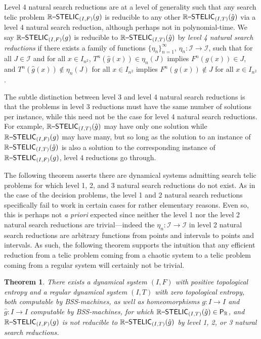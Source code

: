 \documentclass{amsart}
\theoremstyle{theorem}
\newtheorem{theorem}{Theorem}[section]
\theoremstyle{remark}
\newcommand{\RR}{\mathbb{R}}
\newcommand{\ccP}{\textsf{\upshape P}}
\newcommand{\ccRSTELIC}{\mathbb{R}\textsf{\upshape --STELIC}}
\newcommand{\cI}{\mathcal{I}}
\begin{document}
Level 4 natural search reductions are at a level of generality such that any search telic problem $\ccRSTELIC_{(I, F)}(g)$ is reducible to any other $\ccRSTELIC_{(I, T)}(\hat{g})$ via a level 4 natural search reduction, although perhaps not in polynomial-time. We say $\ccRSTELIC_{(I, F)}(g)$ is reducible to $\ccRSTELIC_{(I, T)}(\hat{g})$ by \emph{level 4 natural search reductions} if there exists a family of functions $\{\eta_n\}_{n=1}^\infty$, $\eta_n:\cI\rightarrow \cI$, such that for all $J \in \cI$ and for all $x \in I_{n^2}$, $T^n(\hat{g}(x)) \in \eta_n(J)$ implies $F^n(g(x)) \in J$, and $T^n(\hat{g}(x)) \not\in \eta_n(J)$ for all $x \in I_{n^2}$ implies $F^n(g(x)) \not\in J$ for all $x \in I_{n^2}$.

The subtle distinction between level 3 and level 4 natural search reductions is that the problems in level 3 reductions must have the same number of solutions per instance, while this need not be the case for level 4 natural search reductions. For example, $\ccRSTELIC_{(I, T)}(\hat{g})$ may have only one solution while $\ccRSTELIC_{(I, F)}(g)$ may have many, but so long as the solution to an instance of $\ccRSTELIC_{(I, T)}(\hat{g})$ is also a solution to the corresponding instance of $\ccRSTELIC_{(I, F)}(g)$, level 4 reductions go through.

The following theorem asserts there are dynamical systems admitting search telic problems for which level 1, 2, and 3 natural search reductions do not exist. As in the case of the decision problems, the level 1 and 2 natural search reductions specifically fail to work in certain cases for rather elementary reasons. Even so, this is perhaps not \emph{a priori} expected since neither the level 1 nor the level 2 natural search reductions are trivial---indeed the $\eta_n:\cI\rightarrow \cI$ in level 2 natural search reductions are arbitrary functions from points and intervals to points and intervals. As such, the following theorem supports the intuition that any efficient reduction from a telic problem coming from a chaotic system to a telic problem coming from a regular system will certainly not be trivial.

\begin{theorem}\label{thmNoNaturalSearch}
There exists a dynamical system $(I, F)$ with positive topological entropy and a regular dynamical system $(I, T)$ with zero topological entropy, both computable by BSS-machines, as well as homeomorphisms $g:I\rightarrow I$ and $\hat{g}:I\rightarrow I$ computable by BSS-machines, for which $\ccRSTELIC_{(I, T)}(\hat{g}) \in \ccP_\RR$, and $\ccRSTELIC_{(I, F)}(g)$ is not reducible to $\ccRSTELIC_{(I, T)}(\hat{g})$ by level 1, 2, or 3 natural search reductions.
\end{theorem}
\end{document}
